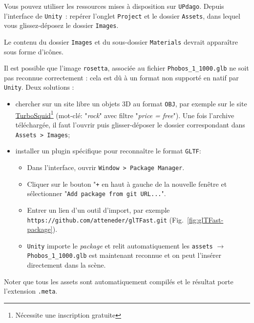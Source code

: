 \documentclass[a4paper,10pt]{article}
\newenvironment{solution}%
{\begin{tcolorbox}[breakable,colback=red!5!white,colframe=red!75!black,title=Solution]}%
{\end{tcolorbox}}
\begin{document}
Vous pouvez utiliser les ressources mises à disposition sur \texttt{UPdago}. Depuis l'interface de \texttt{Unity}~: repérer l'onglet \texttt{Project} et le dossier \texttt{Assets}, dans lequel vous glissez-déposez le dossier \texttt{Images}.

\ifversionenseignant
\begin{solution}
Le contenu du dossier \texttt{Images} et du sous-dossier \texttt{Materials} devrait apparaître sous forme d'icônes. 

Il est possible que l'image \texttt{rosetta}, associée au fichier \texttt{Phobos\_1\_1000.glb} ne soit pas reconnue correctement : cela est dû à un format non supporté en natif par \texttt{Unity}. Deux solutions :
\begin{itemize}
	\item chercher sur un site libre un objets 3D au format \texttt{OBJ}, par exemple sur le site \href{https://turbosquid.com/}{TurboSquid}\footnote{Nécessite une inscription gratuite} (mot-clé: "\textit{rock}" avec filtre "\textit{price = free}"). Une fois l'archive téléchargée, il faut l'ouvrir puis glisser-déposer le dossier correspondant dans \texttt{Assets > Images};
	\item installer un plugin spécifique pour reconnaître le format \texttt{GLTF}:
	\begin{itemize}
		\item Dans l'interface, ouvrir \texttt{Window > Package Manager}.
		\item Cliquer sur le bouton "\texttt{{\large +}} en haut à gauche de la nouvelle fenêtre et sélectionner "\texttt{Add package from git URL...}".
		\item Entrer un lien d'un outil d'import, par exemple \texttt{https://github.com/atteneder/glTFast.git} (Fig.~\ref{fig:glTFast-package}).
		\item \texttt{Unity} importe le \textit{package} et relit automatiquement les \texttt{assets} $\rightarrow$ \texttt{Phobos\_1\_1000.glb} est maintenant reconnue et on peut l'insérer directement dans la scène.
		
	\end{itemize}
\end{itemize}
		
Noter que tous les assets sont automatiquement compilés et le résultat porte l'extension \texttt{.meta}.
\end{solution}
\end{document}
